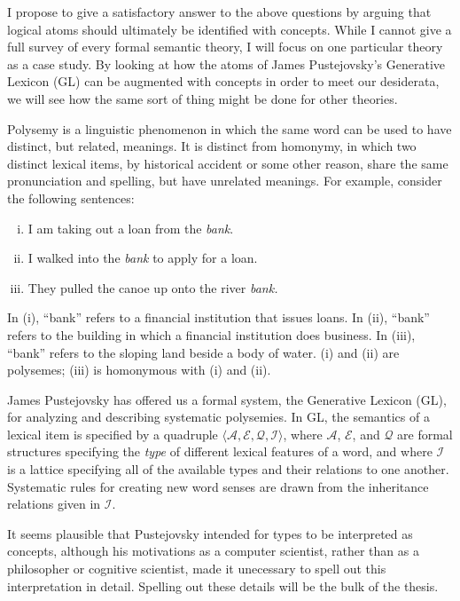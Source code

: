 \documentclass[12pt]{amsart}
\begin{document}
I propose to give a satisfactory answer to the above questions by arguing that logical atoms should ultimately be identified with concepts. While I cannot give a full survey of every formal semantic theory, I will focus on one particular theory as a case study. By looking at how the atoms of James Pustejovsky's Generative Lexicon (GL) can be augmented with concepts in order to meet our desiderata, we will see how the same sort of thing might be done for other theories.

Polysemy is a linguistic phenomenon in which the same word can be used to have distinct, but related, meanings. It is distinct from homonymy, in which two distinct lexical items, by historical accident or some other reason, share the same pronunciation and spelling, but have unrelated meanings. For example, consider the following sentences:
\begin{enumerate}[(i)]
\item I am taking out a loan from the \emph{bank}.
\item I walked into the \emph{bank} to apply for a loan.
\item They pulled the canoe up onto the river \emph{bank.}
\end{enumerate}
In (i), ``bank'' refers to a financial institution that issues loans. In (ii), ``bank'' refers to the building in which a financial institution does business. In (iii), ``bank'' refers to the sloping land beside a body of water. (i) and (ii) are polysemes; (iii) is homonymous with (i) and (ii).

James Pustejovsky \cite{Pustejovsky93} has offered us a formal system, the Generative Lexicon (GL), for analyzing and describing systematic polysemies. In GL, the semantics of a lexical item is specified by a quadruple $\langle\mathcal{A},\mathcal{E},\mathcal{Q},\mathcal{I}\rangle$, where $\mathcal{A}$, $\mathcal{E}$, and $\mathcal{Q}$ are formal structures specifying the \emph{type} of different lexical features of a word, and where $\mathcal{I}$ is a lattice specifying all of the available types and their relations to one another. Systematic rules for creating new word senses are drawn from the inheritance relations given in $\mathcal{I}$.

It seems plausible that Pustejovsky intended for types to be interpreted as concepts, although his motivations as a computer scientist, rather than as a philosopher or cognitive scientist, made it unecessary to spell out this interpretation in detail. Spelling out these details will be the bulk of the thesis.
\end{document}
